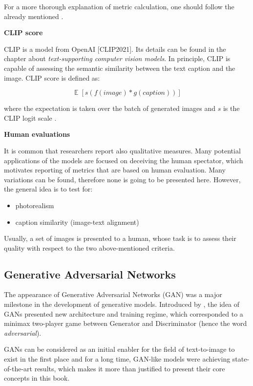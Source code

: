 \documentclass[
]{krantz}
\providecommand{\tightlist}{%
  \setlength{\itemsep}{0pt}\setlength{\parskip}{0pt}}
\renewenvironment{quote}{\begin{VF}}{\end{VF}}
\begin{document}
For a more thorough explanation of metric calculation, one should follow the already mentioned \citet{ImprovedPrecisionRecall2019}.

\textbf{CLIP score}

CLIP is a model from OpenAI {[}CLIP2021{]}. Its details can be found in the chapter about \emph{text-supporting computer vision models}. In principle, CLIP is capable of assessing the semantic similarity between the text caption and the image. CLIP score is defined as:

\begin{quote}
\[\mathop{{}\mathbb{E}}[s(f(image)*g(caption))]\]
\end{quote}

where the expectation is taken over the batch of generated images and \(s\) is the CLIP logit scale \citep{Glide2021}.

\textbf{Human evaluations}

It is common that researchers report also qualitative measures. Many potential applications of the models are focused on deceiving the human spectator, which motivates reporting of metrics that are based on human evaluation. Many variations can be found, therefore none is going to be presented here. However, the general idea is to test for:

\begin{itemize}
\tightlist
\item
  photorealism
\item
  caption similarity (image-text alignment)
\end{itemize}

Usually, a set of images is presented to a human, whose task is to assess their quality with respect to the two above-mentioned criteria.

\hypertarget{generative-adversarial-networks}{%
\subsection{Generative Adversarial Networks}\label{generative-adversarial-networks}}

The appearance of Generative Adversarial Networks (GAN) was a major milestone in the development of generative models. Introduced by \citet{GAN2014}, the idea of GANs presented new architecture and training regime, which corresponded to a minimax two-player game between Generator and Discriminator (hence the word \emph{adversarial}).

GANs can be considered as an initial enabler for the field of text-to-image to exist in the first place and for a long time, GAN-like models were achieving state-of-the-art results, which makes it more than justified to present their core concepts in this book.
\end{document}
